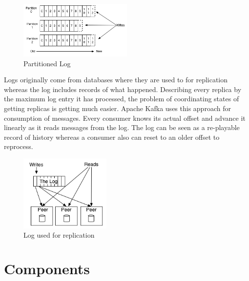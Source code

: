 \begin{figure}[H]
    \centering
    \includegraphics[width=0.5\textwidth]{images/log_anatomy.png}
    \caption{Partitioned Log}
    \label{fig:the-log}
\end{figure}

Logs originally come from databases where they are used to for replication
whereas the log includes records of what happened. Describing every replica by
the maximum log entry it has processed, the problem of coordinating
states of getting replicas is getting much easier. Apache Kafka uses this
approach for consumption of messages. Every consumer knows its actual offset and
advance it linearly as it reads messages from the log. The log can be seen as a
re-playable record of history whereas a consumer also can reset to an older
offset to reprocess.

\begin{figure}[H]
    \centering
    \includegraphics[width=0.4\textwidth]{images/state-machine-replication.png}
    \caption{Log used for replication}
    \label{fig:the-log}
\end{figure}

\section{Components}
